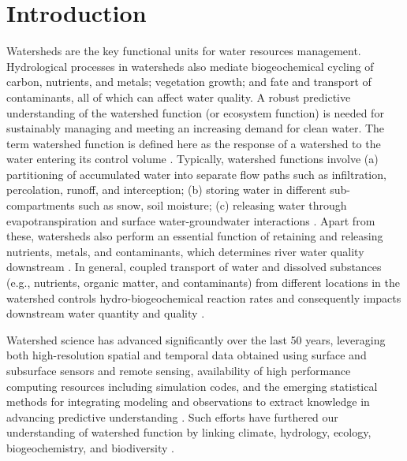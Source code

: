 \documentclass[preprint,review, 12pt]{elsarticle}
\begin{document}
\linenumbers
\section{Introduction}

Watersheds are the key functional units for water resources management. Hydrological processes in watersheds also mediate biogeochemical cycling of carbon, nutrients, and metals; vegetation growth; and fate and transport of contaminants, all of which can affect water quality. A robust predictive understanding of the watershed function (or ecosystem function) is needed for sustainably managing and meeting an increasing demand for clean water. The term watershed function is defined here as the response of a watershed to the water entering its control volume \citep{wagener2007catchment}. Typically, watershed functions involve (a) partitioning of accumulated water into separate flow paths such as infiltration, percolation, runoff, and interception; (b) storing water in different sub-compartments such as snow, soil moisture; (c) releasing water through evapotranspiration and surface water-groundwater interactions \citep{Sivapalan2005, wagener2007catchment}. Apart from these, watersheds also perform an essential function of retaining and releasing nutrients, metals, and contaminants, which determines river water quality downstream \citep{Hubbard2018}. In general, coupled transport of water and dissolved substances (e.g., nutrients, organic matter, and contaminants) from different locations in the watershed controls hydro-biogeochemical reaction rates and consequently impacts downstream water quantity and quality \citep{kirchner2006getting}. 

Watershed science has advanced significantly over the last 50 years, leveraging both high-resolution spatial and temporal data obtained using surface and subsurface sensors and remote sensing, availability of high performance computing resources including simulation codes, and the emerging statistical methods for integrating modeling and observations to extract knowledge in advancing predictive understanding \citep{kirchner2006getting, wagener2007catchment, kirchner2004fine, Hubbard2018, gooseff2007relating, Beven2006a, bear2013dynamics}. Such efforts have furthered our understanding of watershed function by linking climate, hydrology, ecology, biogeochemistry, and biodiversity \citep{Graham2019}.
\end{document}
